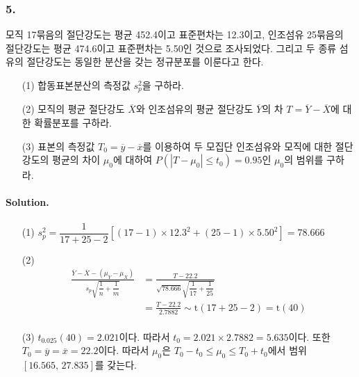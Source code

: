 \subsubsection{5.} 모직 17묶음의 절단강도는 평균 452.4이고 표준편차는 12.3이고, 인조섬유 25묶음의 절단강도는 평균 474.6이고 표준편차는 5.50인 것으로 조사되었다.
그리고 두 종류 섬유의 절단강도는 동일한 분산을 갖는 정규분포를 이룬다고 한다.

\begin{itemize}
    \item[(1)] 합동표본분산의 측정값 $s_p^2$을 구하라.
    \item[(2)] 모직의 평균 절단강도 $\overline{X}$와 인조섬유의 평균 절단강도 $\overline{Y}$의 차 $T=\overline{Y}-\overline{X}$에
    대한 확률분포를 구하라.
    \item[(3)] 표본의 측정값 $T_0=\overline{y}-\overline{x}$를 이용하여 두 모집단 인조섬유와 모직에 대한 절단강도의 평균의
    차이 $\mu_0$에 대하여 $P\left(\left|T-\mu_0\right|\leq t_0\right)=0.95$인 $\mu_0$의 범위를 구하라.  
\end{itemize}

\paragraph{Solution.}

\begin{itemize}
    \item[(1)] {
        $s_p^2=\dfrac{1}{17+25-2}\left[\left(17-1\right)\times12.3^2+\left(25-1\right)\times5.50^2\right]=78.666$
    }
    \item[(2)] {
        \begin{align*}
            \frac{\overline{Y}-\overline{X}-\left(\mu_Y-\mu_X\right)}{s_p\sqrt{\dfrac{1}{n}+\dfrac{1}{m}}}
            &= \frac{T-22.2}{\sqrt{78.666}\sqrt{\dfrac{1}{17}+\dfrac{1}{25}}} \\
            &= \frac{T-22.2}{2.7882} \sim \mathrm{t}\left(17+25-2\right) = \mathrm{t}\left(40\right) \\
        \end{align*}
    }
    \item[(3)] {
        $t_{0.025}\left(40\right)=2.021$이다. 따라서 $t_0=2.021\times 2.7882=5.635$이다. 또한 $T_0=\overline{y}=\overline{x}=22.2$이다.
        따라서 $\mu_0$은 $T_0-t_0\leq \mu_0 \leq T_0+t_0$에서 범위 $\left[16.565,\,27.835\right]$를 갖는다.
    }
\end{itemize}